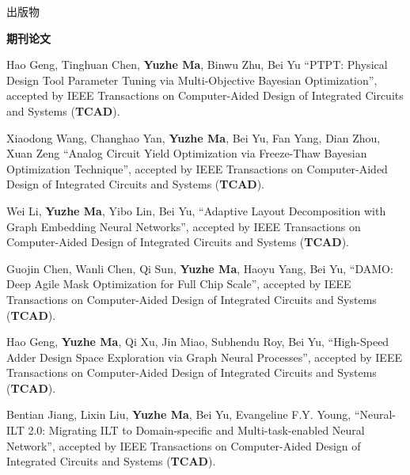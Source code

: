 \begin{rSection}{出版物}

\iffalse
\textbf{Books / Book Chapters}
\begin{description}[font=\normalfont]

\end{description}
\fi

\textbf{期刊论文}
\begin{description}[font=\normalfont]
\iffalse
\item \textbf{Submitted}

\fi

\item[{[J18]}] {
    Hao Geng, Tinghuan Chen, \textbf{Yuzhe Ma}, Binwu Zhu, Bei Yu
    ``PTPT: Physical Design Tool Parameter Tuning via Multi-Objective Bayesian Optimization'',
    accepted by IEEE Transactions on Computer-Aided Design of Integrated Circuits and Systems (\textbf{TCAD}).
}


\item[{[J17]}] {
	Xiaodong Wang, Changhao Yan, \textbf{Yuzhe Ma}, Bei Yu, Fan Yang, Dian Zhou, Xuan Zeng 
	``Analog Circuit Yield Optimization via Freeze-Thaw Bayesian Optimization Technique'',
	accepted by IEEE Transactions on Computer-Aided Design of Integrated Circuits and Systems (\textbf{TCAD}).
}

\item[{[J16]}] {
	Wei Li, \textbf{Yuzhe Ma}, Yibo Lin, Bei Yu,
	``Adaptive Layout Decomposition with Graph Embedding Neural Networks'',
	accepted by IEEE Transactions on Computer-Aided Design of Integrated Circuits and Systems (\textbf{TCAD}).
}

\item[{[J15]}] {
    Guojin Chen, Wanli Chen, Qi Sun, \textbf{Yuzhe Ma}, Haoyu Yang, Bei Yu,
    ``DAMO: Deep Agile Mask Optimization for Full Chip Scale'',
    accepted by IEEE Transactions on Computer-Aided Design of Integrated Circuits and Systems (\textbf{TCAD}).
}


\item[{[J14]}] {
    Hao Geng, \textbf{Yuzhe Ma}, Qi Xu, Jin Miao, Subhendu Roy, Bei Yu,
    ``High-Speed Adder Design Space Exploration via Graph Neural Processes'',
    accepted by IEEE Transactions on Computer-Aided Design of Integrated Circuits and Systems (\textbf{TCAD}).
}


\item[{[J13]}] {
    Bentian Jiang, Lixin Liu, \textbf{Yuzhe Ma}, Bei Yu, Evangeline F.Y. Young,
    ``Neural-ILT 2.0: Migrating ILT to Domain-specific and Multi-task-enabled Neural Network'',
    accepted by IEEE Transactions on Computer-Aided Design of Integrated Circuits and Systems (\textbf{TCAD}).
}


\end{description}
\end{rSection}
